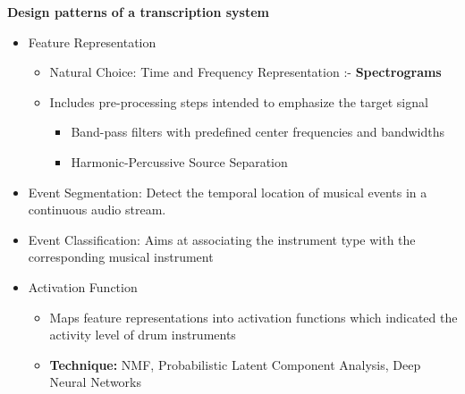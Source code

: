 \begin{frame}[t,fragile]{\textbf{Design patterns of a transcription system}}
\begin{itemize}
\item Feature Representation
\begin{itemize}
\item Natural Choice: Time and Frequency Representation :- \textbf{Spectrograms}
\item Includes pre-processing steps intended to emphasize the target signal
\begin{itemize}
\item Band-pass filters with predefined center frequencies and bandwidths
\item Harmonic-Percussive Source Separation
\end{itemize}
\end{itemize}
\item Event Segmentation: Detect the temporal location of musical events in a continuous audio stream.
\item Event Classification: Aims at associating the instrument type with the corresponding musical instrument
\item Activation Function
\begin{itemize}
\item Maps feature representations into activation functions which indicated the activity level of drum instruments
\item \textbf{Technique:} NMF, Probabilistic Latent Component Analysis, Deep Neural Networks
\end{itemize}

\end{itemize}
\end{frame}

 

